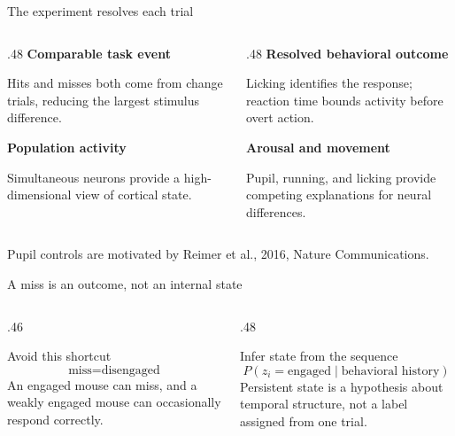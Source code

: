 \documentclass[aspectratio=169,10pt]{beamer}
\newcommand{\sourceNote}[1]{%
  \par\vfill{\fontsize{6}{7}\selectfont\color{NMAMidGray}#1}%
}
\begin{document}
\begin{frame}{The experiment resolves each trial}
  \begin{columns}[T,onlytextwidth]
    \begin{column}{.48\textwidth}
      \textbf{Comparable task event}

      Hits and misses both come from change trials, reducing the largest
      stimulus difference.

      \vspace{.8em}
      \textbf{Population activity}

      Simultaneous neurons provide a high-dimensional view of cortical state.
    \end{column}
    \begin{column}{.48\textwidth}
      \textbf{Resolved behavioral outcome}

      Licking identifies the response; reaction time bounds activity before
      overt action.

      \vspace{.8em}
      \textbf{Arousal and movement}

      Pupil, running, and licking provide competing explanations for neural
      differences.
    \end{column}
  \end{columns}

  \sourceNote{Pupil controls are motivated by Reimer et al., 2016, Nature Communications.}
\end{frame}

\begin{frame}{A miss is an outcome, not an internal state}
  \begin{columns}[c,onlytextwidth]
    \begin{column}{.46\textwidth}
      \begin{alertblock}{Avoid this shortcut}
        \[
          \text{miss}=\text{disengaged}
        \]
        An engaged mouse can miss, and a weakly engaged mouse can occasionally
        respond correctly.
      \end{alertblock}
    \end{column}
    \begin{column}{.48\textwidth}
      \begin{block}{Infer state from the sequence}
        \[
          P(z_i=\text{engaged}\mid\text{behavioral history})
        \]
        Persistent state is a hypothesis about temporal structure, not a label
        assigned from one trial.
      \end{block}
    \end{column}
  \end{columns}

\end{frame}
\end{document}
